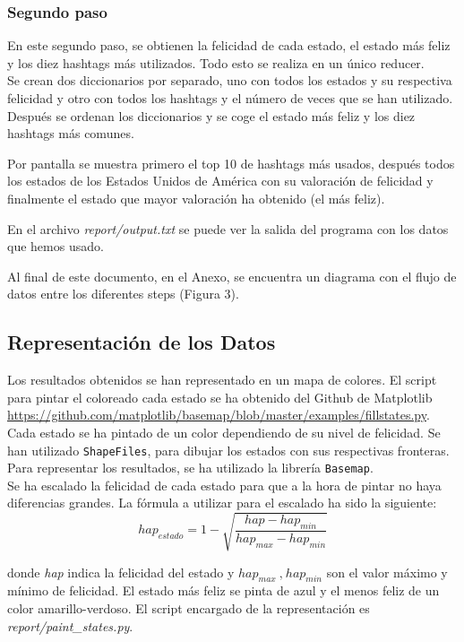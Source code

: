 \documentclass[12pt,a4paper]{article}
\begin{document}
\begin{itemize}
\subsubsection{Segundo paso}

En este segundo paso, se obtienen  la felicidad de cada estado, el estado más feliz y los diez hashtags más utilizados. Todo esto se realiza en un único reducer.\\

Se crean dos diccionarios por separado, uno con todos los estados y su respectiva felicidad y otro con todos los hashtags y el número de veces que se han utilizado. Después se ordenan los diccionarios y se coge el estado más feliz y los diez hashtags más comunes.

Por pantalla se muestra primero el top 10 de hashtags más usados, después todos los estados de los Estados Unidos de América con su valoración de felicidad y finalmente el estado que mayor valoración ha obtenido (el más feliz).

En el archivo \textit{report/output.txt} se puede ver la salida del programa con los datos que hemos usado.
\end{itemize}

Al final de este documento, en el Anexo, se encuentra un diagrama con el flujo de datos entre los diferentes steps (Figura 3).

\subsection{Representación de los Datos}
Los resultados obtenidos se han representado en un mapa de colores. El script para pintar el coloreado cada estado se ha obtenido del Github de Matplotlib 	\url{https://github.com/matplotlib/basemap/blob/master/examples/fillstates.py}.\\
Cada estado se ha pintado de un color dependiendo de su nivel de felicidad. Se han utilizado \texttt{ShapeFiles}, para dibujar los estados con sus respectivas fronteras. Para representar los resultados, se ha utilizado la librería \texttt{Basemap}.\\

Se ha escalado la felicidad de cada estado para que a la hora de pintar no haya diferencias grandes. La fórmula a utilizar para el escalado ha sido la siguiente:
$$hap_{estado}=1-\displaystyle \sqrt{\dfrac{hap-hap_{min}}{hap_{max}-hap_{min}}}$$

donde \textit{hap} indica la felicidad del estado y $hap_{max}\ \text{,}\ hap_{min}$ son el valor máximo y mínimo de felicidad.
El estado más feliz se pinta de azul y el menos feliz de un color amarillo-verdoso. El script encargado de la representación es \textit{report/paint\_states.py}. 
\end{document}
